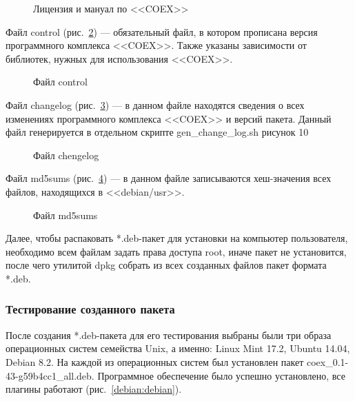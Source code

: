 \begin{figure}[h!]
\caption{ Лицензия и мануал по <<COEX>> }
\label{LIcenzMan:LIcenzMan}
\end{figure}

Файл control (рис.~\ref{control:control}) --- обязательный файл, в котором прописана версия программного комплекса <<COEX>>. Также указаны зависимости от библиотек, нужных для использования <<COEX>>.

\begin{figure}[h!]
\caption{ Файл control }
\label{control:control}
\end{figure}

Файл changelog (рис.~\ref{chengelog:chengelog}) --- в данном файле находятся сведения о всех изменениях программного комплекса <<COEX>> и версий пакета. Данный файл генерируется в отдельном скрипте gen\_change\_log.sh рисунок 10

\begin{figure}[h!]
\caption{ Файл chengelog }
\label{chengelog:chengelog}
\end{figure}

Файл md5sums (рис.~\ref{md5sums:md5sums}) --- в данном файле записываются хеш-значения всех файлов, находящихся в <<debian/usr>>.

\begin{figure}[h!]
\caption{ Файл md5sums }
\label{md5sums:md5sums}
\end{figure}

Далее, чтобы распаковать *.deb-пакет для установки на компьютер пользователя, необходимо всем файлам задать права доступа root, иначе пакет не установится, после чего утилитой dpkg собрать из всех созданных файлов пакет формата *.deb. 

\subsubsection{Тестирование созданного пакета}

После создания *.deb-пакета для его тестирования выбраны были три образа операционных систем семейства Unix, а именно: Linux Mint 17.2, Ubuntu 14.04, Debian 8.2. На каждой из операционных систем был установлен пакет coex\_0.1-43-g59b4cc1\_all.deb. Программное обеспечение было успешно установлено, все плагины работают (рис.~\ref{debian:debian}).

